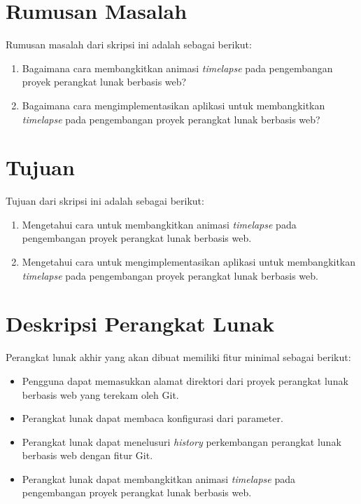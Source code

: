 \documentclass[a4paper,twoside]{article}
\begin{document}
\section{Rumusan Masalah}
Rumusan masalah dari skripsi ini adalah sebagai berikut:
\begin{enumerate}
	\item Bagaimana cara membangkitkan animasi \textit{timelapse} pada pengembangan proyek perangkat lunak berbasis web?
	\item Bagaimana cara mengimplementasikan aplikasi untuk membangkitkan \textit{timelapse} pada pengembangan proyek perangkat lunak berbasis web?
\end{enumerate}
\section{Tujuan}
Tujuan dari skripsi ini adalah sebagai berikut:
\begin{enumerate}
	\item Mengetahui cara untuk membangkitkan animasi \textit{timelapse} pada pengembangan proyek perangkat lunak berbasis web.
	\item Mengetahui cara untuk mengimplementasikan aplikasi untuk membangkitkan \textit{timelapse} pada pengembangan proyek perangkat lunak berbasis web. 
\end{enumerate} 
\section{Deskripsi Perangkat Lunak}
Perangkat lunak akhir yang akan dibuat memiliki fitur minimal sebagai berikut:
\begin{itemize}
	\item Pengguna dapat memasukkan alamat direktori dari proyek perangkat lunak berbasis web yang terekam oleh Git.
	\item Perangkat lunak dapat membaca konfigurasi dari parameter.
	\item Perangkat lunak dapat menelusuri \textit{history} perkembangan perangkat lunak berbasis web dengan fitur Git.   
	\item Perangkat lunak dapat membangkitkan animasi \textit{timelapse} pada pengembangan proyek perangkat lunak berbasis web.
	 
\end{itemize}
\end{document}
